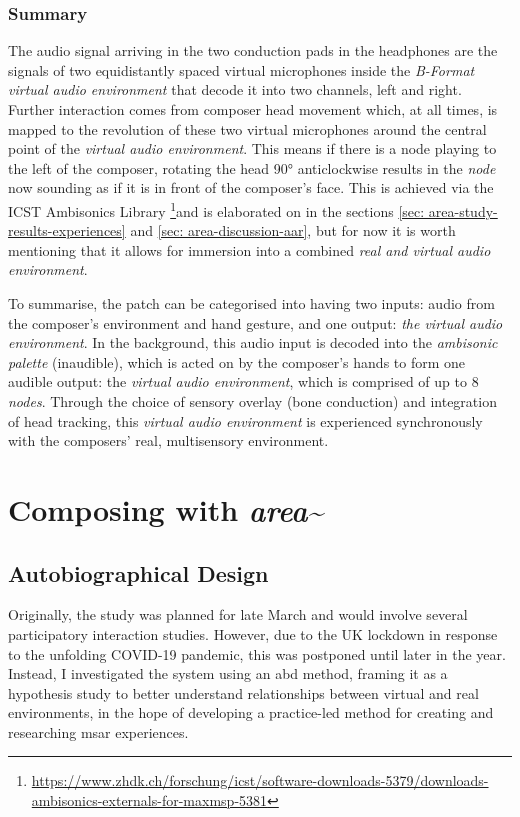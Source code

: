 \subsubsection{Summary}\label{sec: area-system-software-summary}
The audio signal arriving in the two conduction pads in the headphones are the signals of two equidistantly spaced virtual microphones inside the \textit{B-Format virtual audio environment} that decode it into two channels, left and right. Further interaction comes from composer head movement which, at all times, is mapped to the revolution of these two virtual microphones around the central point of the \textit{virtual audio environment}. This means if there is a node playing to the left of the composer, rotating the head 90° anticlockwise results in the \textit{node} now sounding as if it is in front of the composer's face. This is achieved via the ICST Ambisonics Library \citep{schacher2006} \footnote{\url{https://www.zhdk.ch/forschung/icst/software-downloads-5379/downloads-ambisonics-externals-for-maxmsp-5381}}and is elaborated on in the sections \autoref{sec: area-study-results-experiences} and \autoref{sec: area-discussion-aar}, but for now it is worth mentioning that it allows for immersion into a combined \textit{real and virtual audio environment}.

To summarise, the patch can be categorised into having two inputs: audio from the composer's environment and hand gesture, and one output: \textit{the virtual audio environment}. In the background, this audio input is decoded into the \textit{ambisonic palette} (inaudible), which is acted on by the composer's hands to form one audible output: the \textit{virtual audio environment}, which is comprised of up to 8 \textit{nodes}. Through the choice of sensory overlay (bone conduction) and integration of head tracking, this \textit{virtual audio environment} is experienced synchronously with the composers' real, multisensory environment. 



\section{Composing with \textit{area\textasciitilde{}}}\label{sec: area-study}
\subsection{Autobiographical Design}\label{sec: area-study-abd}
Originally, the study was planned for late March and would involve several participatory interaction studies. However, due to the UK lockdown in response to the unfolding COVID-19 pandemic, this was postponed until later in the year. Instead, I investigated the system using an \gls{abd} method, framing it as a hypothesis study to better understand relationships between virtual and real environments, in the hope of developing a practice-led method for creating and researching \gls{msar} experiences. 

